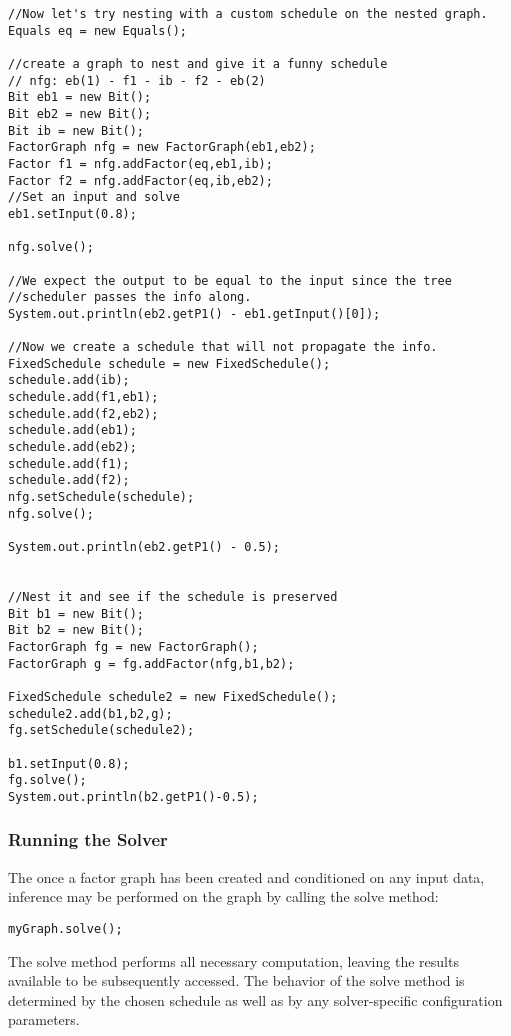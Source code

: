 \fi

\ifjava

\begin{lstlisting}
//Now let's try nesting with a custom schedule on the nested graph.
Equals eq = new Equals();
	
//create a graph to nest and give it a funny schedule    
// nfg: eb(1) - f1 - ib - f2 - eb(2)
Bit eb1 = new Bit();
Bit eb2 = new Bit();
Bit ib = new Bit();
FactorGraph nfg = new FactorGraph(eb1,eb2);
Factor f1 = nfg.addFactor(eq,eb1,ib);
Factor f2 = nfg.addFactor(eq,ib,eb2);
//Set an input and solve
eb1.setInput(0.8);

nfg.solve();

//We expect the output to be equal to the input since the tree
//scheduler passes the info along.
System.out.println(eb2.getP1() - eb1.getInput()[0]);

//Now we create a schedule that will not propagate the info.
FixedSchedule schedule = new FixedSchedule();
schedule.add(ib);
schedule.add(f1,eb1);
schedule.add(f2,eb2);
schedule.add(eb1);
schedule.add(eb2);
schedule.add(f1);
schedule.add(f2);
nfg.setSchedule(schedule);
nfg.solve();

System.out.println(eb2.getP1() - 0.5);

		
//Nest it and see if the schedule is preserved
Bit b1 = new Bit();
Bit b2 = new Bit();
FactorGraph fg = new FactorGraph();
FactorGraph g = fg.addFactor(nfg,b1,b2);

FixedSchedule schedule2 = new FixedSchedule();
schedule2.add(b1,b2,g);
fg.setSchedule(schedule2);

b1.setInput(0.8);		
fg.solve();
System.out.println(b2.getP1()-0.5);

\end{lstlisting}

\fi

\subsubsection{Running the Solver}

The once a factor graph has been created and conditioned on any input data, inference may be performed on the graph by calling the solve method:



\begin{lstlisting}
myGraph.solve();
\end{lstlisting}

The solve method performs all necessary computation, leaving the results available to be subsequently accessed.  The behavior of the solve method is determined by the chosen schedule as well as by any solver-specific configuration parameters.

